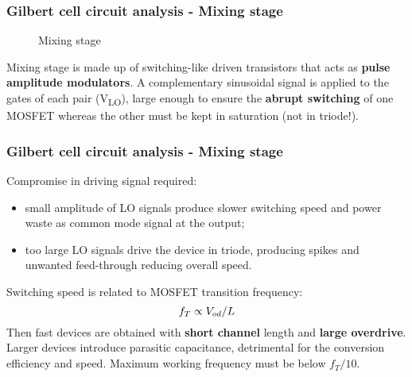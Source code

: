 \begin{frame}
	\frametitle{Gilbert cell circuit analysis - Mixing stage}
	\begin{figure} [H]
		\centering
		\caption{Mixing stage}
		\label{fig:MixStage}
	\end{figure}
	Mixing stage is made up of switching-like driven transistors that acts as \textbf{pulse amplitude modulators}. %
	A complementary sinusoidal signal is applied to the gates of each pair (V\textsubscript{LO}), large enough to ensure the \textbf{abrupt switching} of one MOSFET whereas the other must be kept in saturation (not in  triode!).
\end{frame}

\begin{frame}
	\frametitle{Gilbert cell circuit analysis - Mixing stage}
	Compromise in driving signal required:
	\begin{itemize}
		\item small amplitude of LO signals produce slower switching speed and power waste as common mode signal at the output;
		\item too large LO signals drive the device in triode, producing spikes and unwanted feed-through reducing overall speed.
	\end{itemize}
	Switching speed is related to MOSFET transition frequency:
	\begin{equation}
	f_T \propto  V_{od}/L \notag
	\end{equation}
	Then fast devices are obtained with \textbf{short channel} length and \textbf{large overdrive}. Larger devices introduce parasitic capacitance, detrimental for the conversion efficiency and speed. Maximum working frequency must be below $f_T/10$.
\end{frame}

